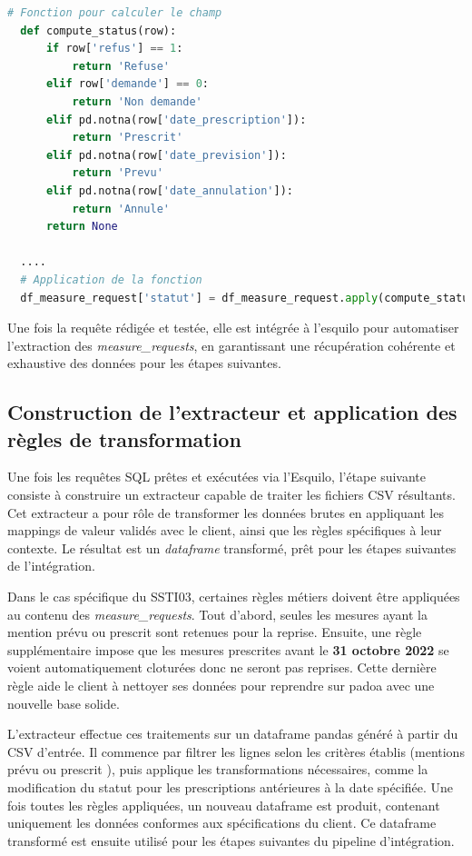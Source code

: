 \begin{lstlisting}[language=Python, caption=Calcul de statut]
  # Fonction pour calculer le champ
  def compute_status(row):
      if row['refus'] == 1:
          return 'Refuse'
      elif row['demande'] == 0:
          return 'Non demande'
      elif pd.notna(row['date_prescription']):
          return 'Prescrit'
      elif pd.notna(row['date_prevision']):
          return 'Prevu'
      elif pd.notna(row['date_annulation']):
          return 'Annule'
      return None

  ....
  # Application de la fonction
  df_measure_request['statut'] = df_measure_request.apply(compute_status, axis=1)
\end{lstlisting}

Une fois la requête rédigée et testée, elle est intégrée à l’esquilo pour automatiser l’extraction des \textit{measure\_requests}, en garantissant une récupération cohérente et exhaustive des données pour les étapes suivantes.


\subsection{Construction de l’extracteur et application des règles de transformation}

Une fois les requêtes SQL prêtes et exécutées via l’Esquilo, l’étape suivante consiste à construire un extracteur capable de traiter les fichiers CSV résultants. Cet extracteur a pour rôle de transformer les données brutes en appliquant les mappings de valeur validés avec le client, ainsi que les règles spécifiques à leur contexte. Le résultat est un \textit{dataframe} transformé, prêt pour les étapes suivantes de l’intégration.

Dans le cas spécifique du SSTI03, certaines règles métiers doivent être appliquées au contenu des \textit{measure\_requests}. Tout d’abord, seules les mesures ayant la mention \og prévu \fg{} ou \og prescrit \fg{} sont retenues pour la reprise. Ensuite, une règle supplémentaire impose que les mesures prescrites avant le \textbf{31 octobre 2022} se voient automatiquement cloturées donc ne seront pas reprises. Cette dernière règle aide le client à nettoyer ses données pour reprendre sur padoa avec une nouvelle base solide.

L’extracteur effectue ces traitements sur un dataframe pandas généré à partir du CSV d’entrée. Il commence par filtrer les lignes selon les critères établis (mentions \og prévu \fg{} ou \og prescrit \fg{}), puis applique les transformations nécessaires, comme la modification du statut pour les prescriptions antérieures à la date spécifiée. Une fois toutes les règles appliquées, un nouveau dataframe est produit, contenant uniquement les données conformes aux spécifications du client. Ce dataframe transformé est ensuite utilisé pour les étapes suivantes du pipeline d’intégration.

